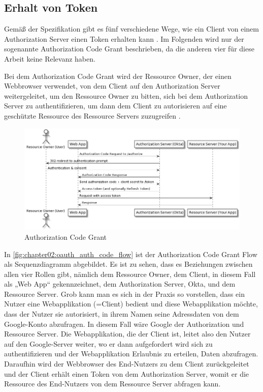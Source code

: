 \subsection{Erhalt von Token}
\label{subsec:OAuth2:ErhaltvonToken}

Gemäß der Spezifikation gibt es fünf verschiedene Wege, wie ein Client von einem Authorization Server einen Token erhalten kann \citep{oauth2:2012}. Im Folgenden wird nur der sogenannte Authorization Code Grant beschrieben, da die anderen vier für diese Arbeit keine Relevanz haben.\smallskip

Bei dem Authorization Code Grant wird der Ressource Owner, der einen Webbrowser verwendet, von dem Client auf den Authorization Server weitergeleitet, um den Ressource Owner zu bitten, sich bei dem Authorization Server zu authentifizieren, um dann dem Client zu autorisieren auf eine geschützte Ressource des Ressource Servers zuzugreifen \citep{oauth2:2012}. 

\begin{figure}[htbp]
  \centering
  \includegraphics[width=1.0\textwidth]{gfx/oauth_auth_code_flow.png}
  \caption{Authorization Code Grant \citep{okta:2020}}
  \label{fig:chapter02:oauth_auth_code_flow}
\end{figure}

In \autoref{fig:chapter02:oauth_auth_code_flow} ist der Authorization Code Grant Flow als Sequenzdiagramm abgebildet. Es ist zu sehen, dass es Beziehungen zwischen allen vier Rollen gibt, nämlich dem Ressource Owner, dem Client, in diesem Fall als „Web App“ gekennzeichnet, dem Authorization Server, Okta, und dem Ressource Server. 
Grob kann man es sich in der Praxis so vorstellen, dass ein Nutzer eine Webapplikation (=Client) bedient und diese Webapplikation möchte, dass der Nutzer sie autorisiert, in ihrem Namen seine Adressdaten von dem Google-Konto abzufragen. In diesem Fall wäre Google der Authorization und Ressource Server. Die Webapplikation, die der Client ist, leitet also den Nutzer auf den Google-Server weiter, wo er dann aufgefordert wird sich zu authentifizieren und der Webapplikation Erlaubnis zu erteilen, Daten abzufragen. Daraufhin wird der Webbrowser des End-Nutzers zu dem Client zurückgeleitet und der Client erhält einen Token von dem Authorization Server, womit er die Ressource des End-Nutzers von dem Ressource Server abfragen kann. 


